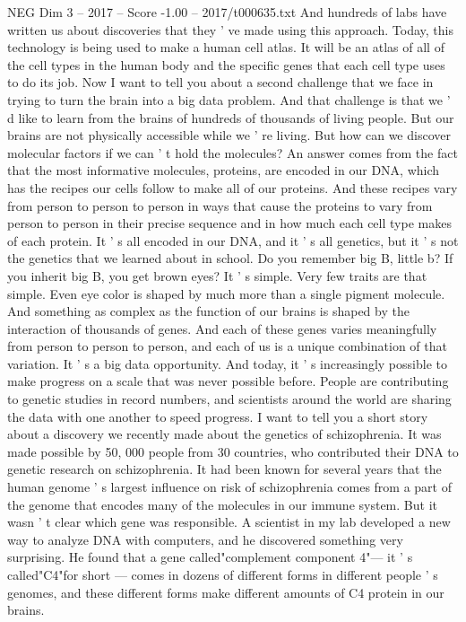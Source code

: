 \begin{textsample}{NEG Dim 3 – 2017 – Score -1.00 – 2017/t000635.txt}
And hundreds of labs have written us about discoveries that they ' ve made using this approach.
Today, this technology is being used to make a human cell atlas.
It will be an atlas of all of the cell types in the human body and the specific genes that each cell type uses to do its job.
Now I want to tell you about a second challenge that we face in trying to turn the brain into a big data problem.
And that challenge is that we ' d like to learn from the brains of hundreds of thousands of living people.
But our brains are not physically accessible while we ' re living.
But how can we discover molecular factors if we can ' t hold the molecules?
An answer comes from the fact that the most informative molecules, proteins, are encoded in our DNA, which has the recipes our cells follow to make all of our proteins.
And these recipes vary from person to person to person in ways that cause the proteins to vary from person to person in their precise sequence and in how much each cell type makes of each protein.
It ' s all encoded in our DNA, and it ' s all genetics, but it ' s not the genetics that we learned about in school.
Do you remember big B, little b?
If you inherit big B, you get brown eyes?
It ' s simple.
Very few traits are that simple.
Even eye color is shaped by much more than a single pigment molecule.
And something as complex as the function of our brains is shaped by the interaction of thousands of genes.
And each of these genes varies meaningfully from person to person to person, and each of us is a unique combination of that variation.
It ' s a big data opportunity.
And today, it ' s increasingly possible to make progress on a scale that was never possible before.
People are contributing to genetic studies in record numbers, and scientists around the world are sharing the data with one another to speed progress.
I want to tell you a short story about a discovery we recently made about the genetics of schizophrenia.
It was made possible by 50, 000 people from 30 countries, who contributed their DNA to genetic research on schizophrenia.
It had been known for several years that the human genome ' s largest influence on risk of schizophrenia comes from a part of the genome that encodes many of the molecules in our immune system.
But it wasn ' t clear which gene was responsible.
A scientist in my lab developed a new way to analyze DNA with computers, and he discovered something very surprising.
He found that a gene called"complement component 4"— it ' s called"C4"for short — comes in dozens of different forms in different people ' s genomes, and these different forms make different amounts of C4 protein in our brains.

\end{textsample}
